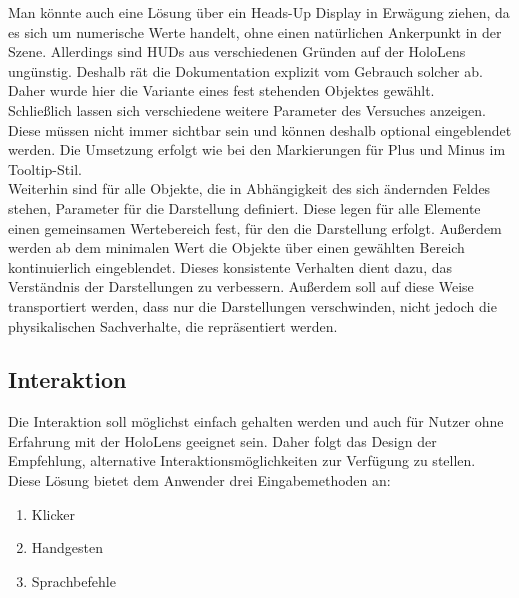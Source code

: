 Man könnte auch eine Lösung über ein Heads-Up Display in Erwägung ziehen, da es sich um numerische Werte handelt, ohne einen natürlichen Ankerpunkt in der Szene. Allerdings sind HUDs aus verschiedenen Gründen auf der HoloLens ungünstig. Deshalb rät die Dokumentation explizit vom Gebrauch solcher ab. Daher wurde hier die Variante eines fest stehenden Objektes gewählt.\\

Schließlich lassen sich verschiedene weitere Parameter des Versuches anzeigen. Diese müssen nicht immer sichtbar sein und können deshalb optional eingeblendet werden. Die Umsetzung erfolgt wie bei den Markierungen für Plus und Minus im Tooltip-Stil.\\

Weiterhin sind für alle Objekte, die in Abhängigkeit des sich ändernden Feldes stehen, Parameter für die Darstellung definiert. Diese legen für alle Elemente einen gemeinsamen Wertebereich fest, für den die Darstellung erfolgt. Außerdem werden ab dem minimalen Wert die Objekte über einen gewählten Bereich kontinuierlich eingeblendet. Dieses konsistente Verhalten dient dazu, das Verständnis der Darstellungen zu verbessern. Außerdem soll auf diese Weise transportiert werden, dass nur die Darstellungen verschwinden, nicht jedoch die physikalischen Sachverhalte, die repräsentiert werden.\\

\subsection{Interaktion}
\label{sec-4-4}
Die Interaktion soll möglichst einfach gehalten werden und auch für Nutzer ohne Erfahrung mit der HoloLens geeignet sein. Daher folgt das Design der Empfehlung, alternative Interaktionsmöglichkeiten zur Verfügung zu stellen. Diese Lösung bietet dem Anwender drei Eingabemethoden an:
\begin{enumerate}
	\setlength{\itemsep}{-5pt}
	\item Klicker
	\item Handgesten
	\item Sprachbefehle
\end{enumerate}

\vspace{8px}
\begin{center}
	\\
\end{center}
\vspace{6px}

